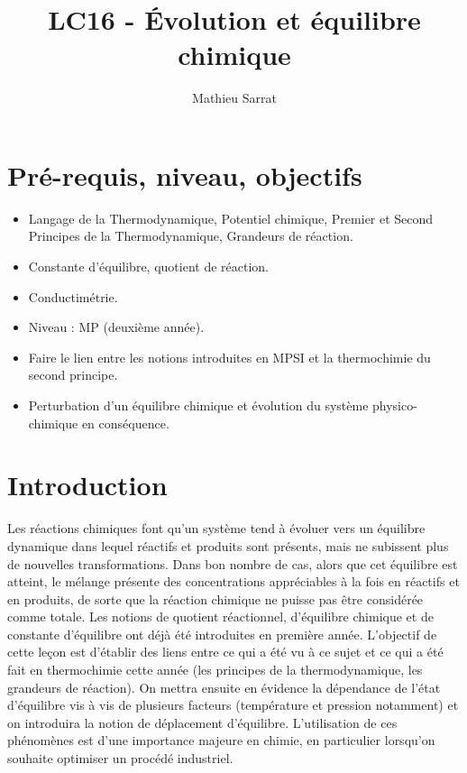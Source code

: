 \documentclass[11pt,a4paper]{report}
\author{Mathieu Sarrat}
\title{LC16 - \'Evolution et équilibre chimique}
\begin{document}
\maketitle

\section*{Pré-requis, niveau, objectifs}

\begin{itemize}
	\item Langage de la Thermodynamique, Potentiel chimique, Premier et Second Principes de la Thermodynamique, Grandeurs de réaction. 
	\item Constante d'équilibre, quotient de réaction.
	\item Conductimétrie.\\
\end{itemize}

\begin{itemize}
	\item Niveau : MP (deuxième année).\\
\end{itemize}

\begin{itemize}
	\item Faire le lien entre les notions introduites en MPSI et la thermochimie du second principe.
	\item Perturbation d'un équilibre chimique et évolution du système physico-chimique en conséquence.
\end{itemize}

\section*{Introduction}

Les réactions chimiques font qu'un système tend à évoluer vers un équilibre dynamique dans lequel réactifs et produits sont présents, mais ne subissent plus de nouvelles transformations. Dans bon nombre de cas, alors que cet équilibre est atteint, le mélange présente des concentrations appréciables à la fois en réactifs et en produits, de sorte que la réaction chimique ne puisse pas être considérée comme totale. Les notions de quotient réactionnel, d'équilibre chimique et de constante d'équilibre ont déjà été introduites en première année. L'objectif de cette leçon est d'établir des liens entre ce qui a été vu à ce sujet et ce qui a été fait en thermochimie cette année (les principes de la thermodynamique, les grandeurs de réaction). On mettra ensuite en évidence la dépendance de l'état d'équilibre vis à vis de plusieurs facteurs (température et pression notamment) et on introduira la notion de déplacement d'équilibre. L'utilisation de ces phénomènes est d'une importance majeure en chimie, en particulier lorsqu'on souhaite optimiser un procédé industriel.
\end{document}
